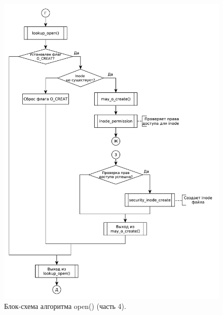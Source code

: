 \begin{figure}[H]
    \centering
    \includegraphics[scale=0.6]{data/newpdg/open_4_may_o_create.pdf}
    \caption{Блок-схема алгоритма open() (часть 4).}
\end{figure}

